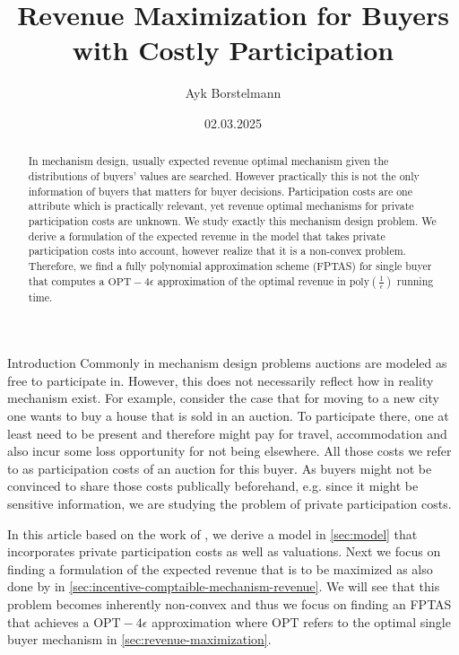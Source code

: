\documentclass[11pt,a4paper]{article}
\author{Ayk Borstelmann}
\title{Revenue Maximization for Buyers with Costly Participation}
\date{02.03.2025}
\newcommand{\1}[1]{\mbox{\rm\bf 1}_{#1}}
\begin{document}
\maketitle

\begin{abstract}
    In mechanism design, usually expected revenue optimal mechanism given the distributions of buyers' values are searched.
    However practically this is not the only information of buyers that matters for buyer decisions.
    Participation costs are one attribute which is practically relevant, yet revenue optimal mechanisms for private participation costs are unknown.
    We study exactly this mechanism design problem.
    We derive a formulation of the expected revenue in the model that takes private participation costs into account, however realize that it is a non-convex problem.
    Therefore, we find a fully polynomial approximation scheme (FPTAS) for single buyer that computes a $\mathrm{OPT} - 4\epsilon$ approximation of the optimal revenue in $\mathrm{poly}\left(\frac{1}{\epsilon}\right)$ running time.
\end{abstract}

\begin{section}{Introduction}
 Commonly in mechanism design problems auctions are modeled as free to participate in.
 However, this does not necessarily reflect how in reality mechanism exist.
 For example, consider the case that for moving to a new city one wants to buy a house that is sold in an auction.
 To participate there, one at least need to be present and therefore might pay for travel, accommodation and also incur some loss opportunity for not being elsewhere.
 All those costs we refer to as participation costs of an auction for this buyer.
 As buyers might not be convinced to share those costs publically beforehand, e.g. since it might be sensitive information, we are studying the problem of private participation costs.

 In this article based on the work of \citet{primary}, we derive a model in \autoref{sec:model} that incorporates private participation costs as well as valuations.
 Next we focus on finding a formulation of the expected revenue that is to be maximized as also done by \citet{myerson} in \autoref{sec:incentive-comptaible-mechanism-revenue}.
 We will see that this problem becomes inherently non-convex and thus we focus on finding an FPTAS that achieves a $\mathrm{OPT} - 4\epsilon$ approximation where $\mathrm{OPT}$ refers to the optimal single buyer mechanism in \autoref{sec:revenue-maximization}.
\end{section}
\end{document}
